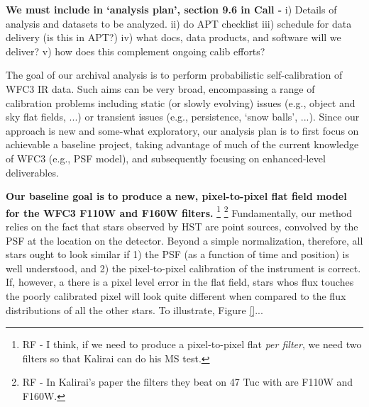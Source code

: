 \documentclass[12pt]{article}
\begin{document}
%
%
\describearchival       %


\textbf{We must include in `analysis plan', section 9.6 in Call -} 
i) Details of analysis and datasets to be analyzed.  ii) do APT
checklist iii) schedule for data delivery (is this in APT?) iv) what
docs, data products, and software will we deliver? v) how does this 
complement ongoing calib efforts?

The goal of our archival analysis is to perform probabilistic
self-calibration of WFC3 IR data.  Such aims can be very broad,
encompassing a range of calibration problems including static (or slowly 
evolving) issues (e.g., object and sky flat fields, ...) or transient
issues (e.g., persistence, `snow balls', ...).  Since our approach is
new and some-what exploratory, our analysis plan is to first focus on
achievable a baseline project, taking advantage of much of the current
knowledge of WFC3 (e.g., PSF model), and subsequently focusing on
enhanced-level deliverables.

\textbf{Our baseline goal is to produce a new, pixel-to-pixel
  flat field model for the WFC3 F110W and F160W filters.} \footnote{RF
  - I think, if we need to produce a pixel-to-pixel flat \emph{per
    filter}, we need two filters so that Kalirai can do his MS test.}
\footnote{RF - In Kalirai's paper the filters they beat on 47 Tuc with
  are F110W and F160W.}  Fundamentally, our method relies on the fact
that stars observed by HST are point sources, convolved by the PSF at
the location on the detector.  Beyond a simple normalization,
therefore, all stars ought to look similar if 1) the PSF (as a
function of time and position) is well understood, and 2) the
pixel-to-pixel calibration of the instrument is correct.  If, however,
a there is a pixel level error in the flat field, stars whos flux
touches the poorly calibrated pixel will look quite different when
compared to the flux distributions of all the other stars.  To
illustrate, Figure \ref{}...
\end{document}
